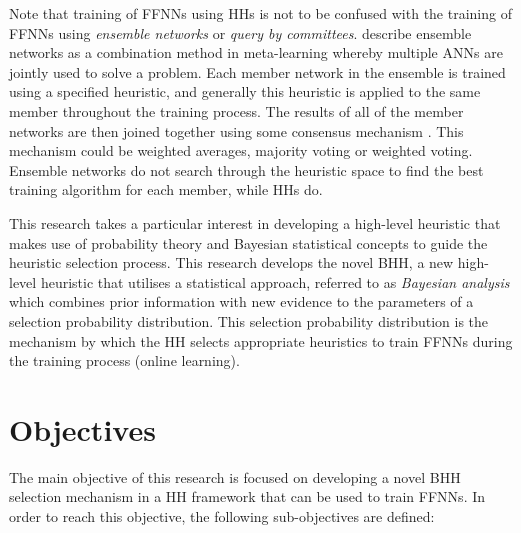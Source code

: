 Note that training of \acp{FFNN} using \acp{HH} is not to be confused with the training of \acp{FFNN} using \textit{ensemble networks} or \textit{query by committees}. \citeauthor{ref:pappa:2014} \cite{ref:pappa:2014} describe ensemble networks as a combination method in meta-learning whereby multiple \acp{ANN} are jointly used to solve a problem. Each member network in the ensemble is trained using a specified heuristic, and generally this heuristic is applied to the same member throughout the training process. The results of all of the member networks are then joined together using some consensus mechanism \cite{ref:zhou:2002}. This mechanism could be weighted averages, majority voting or weighted voting. Ensemble networks do not search through the heuristic space to find the best training algorithm for each member, while \acp{HH} do.

This research takes a particular interest in developing a high-level heuristic that makes use of probability theory and Bayesian statistical concepts to guide the heuristic selection process. This research develops the novel \Acf{BHH}, a new high-level heuristic that utilises a statistical approach, referred to as \textit{Bayesian analysis} which combines prior information with new evidence to the parameters of a selection probability distribution. This selection probability distribution is the mechanism by which the \ac{HH} selects appropriate heuristics to train \acp{FFNN} during the training process (online learning).


\section{Objectives}\label{sec:introduction:objectives}

The main objective of this research is focused on developing a novel \Ac{BHH} selection mechanism in a \ac{HH} framework that can be used to train \acp{FFNN}. In order to reach this objective, the following sub-objectives are defined:


